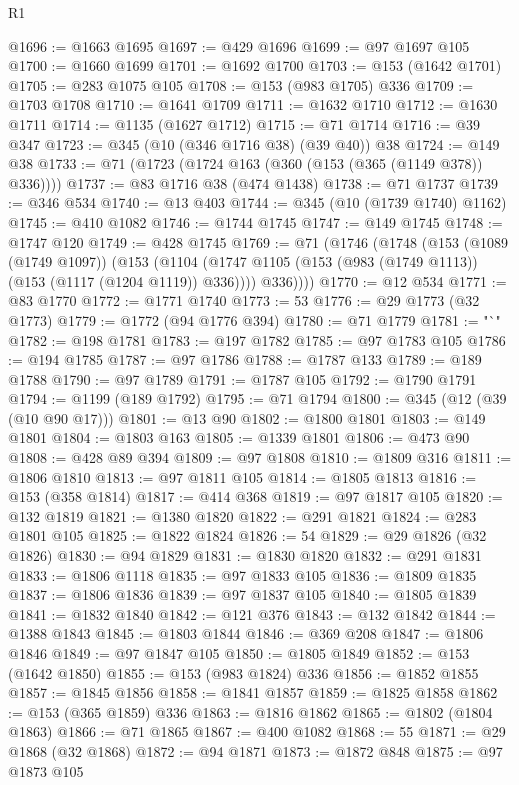 \begin{lexlean}{R1}
\begin{coremodule}
{{{{{{{{{{{{{{{{{{{{{{{{{{{{{{{{{{{{{{{{{{{{{{{{{{{{{{{{{{{{{{{{{{{{{{{{{{{{{{{{{{{{{{{{{{{{{{{{{{{{{{{{{{{{{{{{{{{{{{{{{{{{{{{{{{{{{{{{{{{{{{{{{{{{{{{{{{{{{{{{{{{{{{{{{{{{{{{{{{{{{{{{{{@1696 := @1663 @1695
@1697 := @429 @1696
@1699 := @97 @1697 @105
@1700 := @1660 @1699
@1701 := @1692 @1700
@1703 := @153 (@1642 @1701)
@1705 := @283 @1075 @105
@1708 := @153 (@983 @1705) @336
@1709 := @1703 @1708
@1710 := @1641 @1709
@1711 := @1632 @1710
@1712 := @1630 @1711
@1714 := @1135 (@1627 @1712)
@1715 := @71 @1714
@1716 := @39 @347
@1723 := @345 (@10 (@346 @1716 @38) (@39 @40)) @38
@1724 := @149 @38
@1733 := @71 (@1723 (@1724 @163 (@360 (@153 (@365 (@1149 @378)) @336))))
@1737 := @83 @1716 @38 (@474 @1438)
@1738 := @71 @1737
@1739 := @346 @534
@1740 := @13 @403
@1744 := @345 (@10 (@1739 @1740) @1162)
@1745 := @410 @1082
@1746 := @1744 @1745
@1747 := @149 @1745
@1748 := @1747 @120
@1749 := @428 @1745
@1769 := @71
    (@1746
      (@1748
        (@153
          (@1089 (@1749 @1097))
          (@153
            (@1104 (@1747 @1105 (@153 (@983 (@1749 @1113)) (@153 (@1117 (@1204 @1119)) @336))))
            @336))))
@1770 := @12 @534
@1771 := @83 @1770
@1772 := @1771 @1740
@1773 := 53
@1776 := @29 @1773 (@32 @1773)
@1779 := @1772 (@94 @1776 @394)
@1780 := @71 @1779
@1781 := "`"
@1782 := @198 @1781
@1783 := @197 @1782
@1785 := @97 @1783 @105
@1786 := @194 @1785
@1787 := @97 @1786
@1788 := @1787 @133
@1789 := @189 @1788
@1790 := @97 @1789
@1791 := @1787 @105
@1792 := @1790 @1791
@1794 := @1199 (@189 @1792)
@1795 := @71 @1794
@1800 := @345 (@12 (@39 (@10 @90 @17)))
@1801 := @13 @90
@1802 := @1800 @1801
@1803 := @149 @1801
@1804 := @1803 @163
@1805 := @1339 @1801
@1806 := @473 @90
@1808 := @428 @89 @394
@1809 := @97 @1808
@1810 := @1809 @316
@1811 := @1806 @1810
@1813 := @97 @1811 @105
@1814 := @1805 @1813
@1816 := @153 (@358 @1814)
@1817 := @414 @368
@1819 := @97 @1817 @105
@1820 := @132 @1819
@1821 := @1380 @1820
@1822 := @291 @1821
@1824 := @283 @1801 @105
@1825 := @1822 @1824
@1826 := 54
@1829 := @29 @1826 (@32 @1826)
@1830 := @94 @1829
@1831 := @1830 @1820
@1832 := @291 @1831
@1833 := @1806 @1118
@1835 := @97 @1833 @105
@1836 := @1809 @1835
@1837 := @1806 @1836
@1839 := @97 @1837 @105
@1840 := @1805 @1839
@1841 := @1832 @1840
@1842 := @121 @376
@1843 := @132 @1842
@1844 := @1388 @1843
@1845 := @1803 @1844
@1846 := @369 @208
@1847 := @1806 @1846
@1849 := @97 @1847 @105
@1850 := @1805 @1849
@1852 := @153 (@1642 @1850)
@1855 := @153 (@983 @1824) @336
@1856 := @1852 @1855
@1857 := @1845 @1856
@1858 := @1841 @1857
@1859 := @1825 @1858
@1862 := @153 (@365 @1859) @336
@1863 := @1816 @1862
@1865 := @1802 (@1804 @1863)
@1866 := @71 @1865
@1867 := @400 @1082
@1868 := 55
@1871 := @29 @1868 (@32 @1868)
@1872 := @94 @1871
@1873 := @1872 @848
@1875 := @97 @1873 @105
}}}}}}}}}}}}}}}}}}}}}}}}}}}}}}}}}}}}}}}}}}}}}}}}}}}}}}}}}}}}}}}}}}}}}}}}}}}}}}}}}}}}}}}}}}}}}}}}}}}}}}}}}}}}}}}}}}}}}}}}}}}}}}}}}}}}}}}}}}}}}}}}}}}}}}}}}}}}}}}}}}}}}}}}}}}}}}}}}}}}}}}}}}
\end{coremodule}
\end{lexlean}
